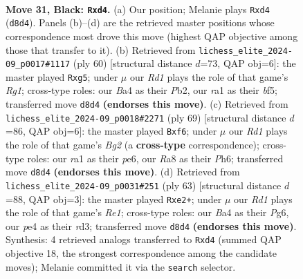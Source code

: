 \documentclass[11pt]{article}
\begin{document}
\clearpage

\begin{figure}[p]\centering
\begin{subfigure}{0.46\textwidth}\centering
\resizebox{\linewidth}{!}{%
\newchessgame
\chessboard[
  setfen={r2r4/pp3pk1/8/7p/bP1QP3/P5Pp/5P2/RB2R1K1 b - - 0 31},
  showmover=false,
  pgfstyle=straightmove, color=movearrow, markmove={d8-d4}
]}
\caption{}
\end{subfigure}\hfill
\begin{subfigure}{0.46\textwidth}\centering
\resizebox{\linewidth}{!}{%
\newchessgame
\chessboard[
  setfen={1r3k2/6pr/p2p4/3Ppbq1/P6P/1pP5/1P2KP2/R5R1 w - - 0 31},
  showmover=false,
  pgfstyle=straightmove, color=movearrow, markmove={g1-g5}
]}
\caption{}
\end{subfigure}
\\[4pt]
\begin{subfigure}{0.46\textwidth}\centering
\resizebox{\linewidth}{!}{%
\newchessgame
\chessboard[
  setfen={8/6bk/4PQpp/4p3/r3P3/4B2P/r4PP1/1R2R1K1 b - - 0 35},
  showmover=false,
  pgfstyle=straightmove, color=movearrow, markmove={g7-f6}
]}
\caption{}
\end{subfigure}\hfill
\begin{subfigure}{0.46\textwidth}\centering
\resizebox{\linewidth}{!}{%
\newchessgame
\chessboard[
  setfen={4rrk1/p6p/6p1/p4p2/2P5/1P1R1PP1/4Q1KP/5R2 b - - 0 32},
  showmover=false,
  pgfstyle=straightmove, color=movearrow, markmove={e8-e2}
]}
\caption{}
\end{subfigure}
\caption{\textbf{Move 31, Black: \texttt{Rxd4}.} (a) Our position; Melanie plays \texttt{Rxd4} (\texttt{d8d4}). Panels (b)--(d) are the retrieved master positions whose correspondence most drove this move (highest QAP objective among those that transfer to it). (b) Retrieved from \texttt{lichess\_elite\_2024-09\_p0017\#1117} (ply 60) [structural distance $d$=73, QAP obj=6]: the master played \texttt{Rxg5}; under $\mu$ our \emph{Rd1} plays the role of that game's \emph{Rg1}; cross-type roles: our \emph{B}a4 as their \emph{P}b2, our \emph{r}a1 as their \emph{b}f5; transferred move \texttt{d8d4} \textbf{(endorses this move)}. (c) Retrieved from \texttt{lichess\_elite\_2024-09\_p0018\#2271} (ply 69) [structural distance $d$=86, QAP obj=6]: the master played \texttt{Bxf6}; under $\mu$ our \emph{Rd1} plays the role of that game's \emph{Bg2} (a \textbf{cross-type} correspondence); cross-type roles: our \emph{r}a1 as their \emph{p}e6, our \emph{R}a8 as their \emph{P}h6; transferred move \texttt{d8d4} \textbf{(endorses this move)}. (d) Retrieved from \texttt{lichess\_elite\_2024-09\_p0031\#251} (ply 63) [structural distance $d$=88, QAP obj=3]: the master played \texttt{Rxe2+}; under $\mu$ our \emph{Rd1} plays the role of that game's \emph{Re1}; cross-type roles: our \emph{B}a4 as their \emph{P}g6, our \emph{p}e4 as their \emph{r}d3; transferred move \texttt{d8d4} \textbf{(endorses this move)}. Synthesis: 4 retrieved analogs transferred to \texttt{Rxd4} (summed QAP objective 18, the strongest correspondence among the candidate moves); Melanie committed it via the \texttt{search} selector.}
\label{fig:thought-m61}
\end{figure}
\end{document}
